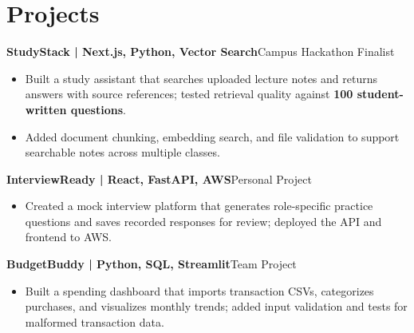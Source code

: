 \documentclass[letterpaper,10pt]{article}
\newcommand{\entry}[2]{\noindent\textbf{#1}\hfill #2\par}
\begin{document}
\section{Projects}
\entry{StudyStack | Next.js, Python, Vector Search}{Campus Hackathon Finalist}
\begin{itemize}
\item Built a study assistant that searches uploaded lecture notes and returns answers with source references; tested retrieval quality against \textbf{100 student-written questions}.
\item Added document chunking, embedding search, and file validation to support searchable notes across multiple classes.
\end{itemize}
\entry{InterviewReady | React, FastAPI, AWS}{Personal Project}
\begin{itemize}
\item Created a mock interview platform that generates role-specific practice questions and saves recorded responses for review; deployed the API and frontend to AWS.
\end{itemize}
\entry{BudgetBuddy | Python, SQL, Streamlit}{Team Project}
\begin{itemize}
\item Built a spending dashboard that imports transaction CSVs, categorizes purchases, and visualizes monthly trends; added input validation and tests for malformed transaction data.
\end{itemize}
\end{document}
